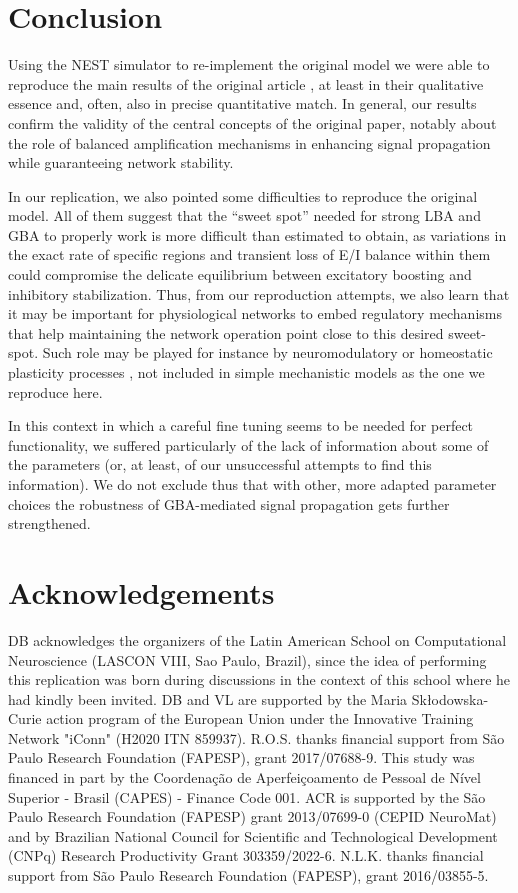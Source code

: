 \section{Conclusion}

Using the NEST simulator to re-implement  the original model we were able to reproduce the main results of the original article \cite{joglekar2018inter}, at least in their qualitative essence and, often, also in precise quantitative match. In general, our results confirm the validity of the central concepts of the original paper, notably about the role of balanced amplification mechanisms in enhancing signal propagation while guaranteeing network stability. 

In our replication, we also pointed some difficulties to reproduce the original model. All of them suggest that the ``sweet spot'' needed for strong LBA and GBA to properly work is more difficult than estimated to obtain, as variations in the exact rate of specific regions and transient loss of E/I balance within them could compromise the delicate equilibrium between excitatory boosting and inhibitory stabilization. Thus, from our reproduction attempts, we also learn that it may be important for physiological networks to embed regulatory mechanisms that help maintaining the network operation point close to this desired sweet-spot. Such role may be played for instance by neuromodulatory or homeostatic plasticity processes \cite{ShineTICS, SjostromTINS}, not included in simple mechanistic models as the one we reproduce here.

In this context in which a careful fine tuning seems to be needed for perfect functionality, we suffered particularly of the lack of information about some of the parameters (or, at least, of our unsuccessful attempts to find this information). We do not exclude thus that with other, more adapted parameter choices the robustness of GBA-mediated signal propagation gets further strengthened.

\section{Acknowledgements}

DB acknowledges the organizers of the Latin American School on Computational Neuroscience (LASCON VIII, Sao Paulo, Brazil), since the idea of performing this replication was born during discussions in the context of this school where he had kindly been invited. DB and VL are supported by the Maria Sk\l odowska-Curie action program of the European Union under the Innovative Training Network "iConn" (H2020 ITN 859937). R.O.S. thanks financial support from São Paulo Research Foundation (FAPESP), grant 2017/07688-9. This study was financed in part by the Coordenação de Aperfeiçoamento de Pessoal de Nível Superior - Brasil (CAPES) - Finance Code 001. ACR is supported by the São Paulo Research Foundation (FAPESP) grant 2013/07699-0 (CEPID NeuroMat) and by Brazilian National Council for Scientific and Technological Development (CNPq) Research Productivity Grant 303359/2022-6. N.L.K. thanks financial support from São Paulo Research Foundation (FAPESP), grant 2016/03855-5. 

